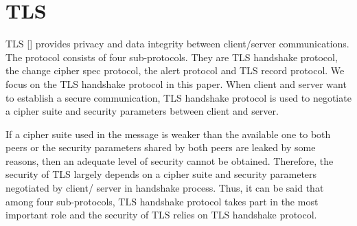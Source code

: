 \documentclass[a4paper,fleqn]{cas-dc}
\begin{document}
\section{TLS}\label{tls}
TLS [\cite{dierk}] provides privacy and data integrity between client/server communications. The protocol consists of four sub-protocols. They are TLS handshake protocol, the change cipher spec protocol, the alert protocol and TLS record protocol. We focus on the TLS handshake protocol in this paper. When client and server want to establish a secure communication, TLS handshake protocol is used to negotiate a cipher suite and security parameters between client and server. 


If a cipher suite used in the message is weaker than the available one to both peers or the security parameters shared by both peers are leaked by some reasons, then an adequate level of security cannot be obtained. Therefore, the security of TLS largely depends on a cipher suite and security parameters negotiated by client/ server in handshake process. Thus, it can be said that among four sub-protocols, TLS handshake protocol takes part in the most important role and the security of TLS relies on TLS handshake protocol. 
\end{document}
